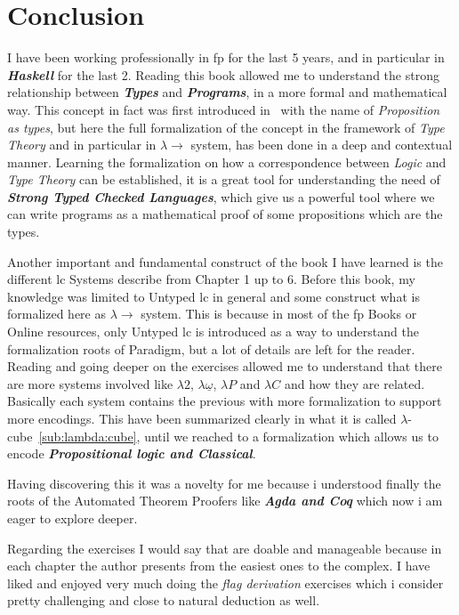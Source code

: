 \documentclass[12pt, a4paper]{article}
\begin{document}
\section{Conclusion}
I have been working professionally in \acrfull{fp} for the last 5 years, and in particular in \textbf{\textit{Haskell}} for the last 2. Reading this book allowed me to understand 
the strong relationship between \textbf{\textit{Types}} and \textbf{\textit{Programs}}, in a more formal and mathematical way. This concept in fact was first introduced in~\cite{howard} 
with the name of \textit{Proposition as types}, but here the full formalization of the concept in the framework of \textit{Type Theory} and in particular in $\lambda \to$ system, has been done
in a deep and contextual manner. Learning the formalization on how a correspondence between \textit{Logic} and \textit{Type Theory} can be established, it is a great tool for understanding the 
need of \textbf{\textit{Strong Typed Checked Languages}}, which give us a powerful tool where we can write programs as a mathematical proof of some propositions which are the types.

Another important and fundamental construct of the book I have learned is the different \acrlong{lc} Systems describe from Chapter 1 up to 6. Before this book, my knowledge was limited to 
Untyped \acrlong{lc} in general and some construct what is formalized here as $\lambda \to$ system. This is because in most of the \acrlong{fp} Books or Online resources, only Untyped \acrlong{lc}
is introduced as a way to understand the formalization roots of Paradigm, but a lot of details are left for the reader. Reading and going deeper on the exercises allowed me to understand that there are more 
systems involved like $\lambda 2$, $\lambda \underline{\omega}$, $\lambda P$ and $\lambda C$ and how they are related. Basically each system contains the previous with more formalization to support more encodings. 
This have been summarized clearly in what it is called $\lambda$-cube~\ref{sub:lambda:cube}, until we reached to a formalization which allows us to encode \textbf{\textit{Propositional logic and Classical}}.

Having discovering this it was a novelty for me because i understood finally the roots of the Automated Theorem Proofers like \textbf{\textit{Agda and Coq}} which now i am eager to explore deeper.

Regarding the exercises I would say that are doable and manageable because in each chapter the author presents from the easiest ones to the complex. I have liked and enjoyed very much doing the \textit{flag derivation}
exercises which i consider pretty challenging and close to natural deduction as well.
\end{document}
